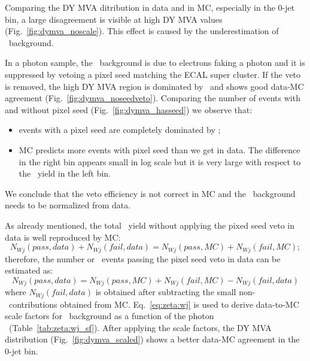 Comparing the DY MVA ditribution in data and in MC, especially in the 0-jet bin, a large disagreement is visible at high DY MVA values (Fig.~\ref{fig:dymva_noscale}).
This effect is caused by the underestimation of \Wjets\ background.

In a photon sample, the \Wjets\ background is due to electrons faking a photon and it is suppressed by vetoing a pixel seed matching the ECAL super cluster.
If the veto is removed, the high DY MVA region is dominated by \Wjets\ and shows good data-MC agreement (Fig.~\ref{fig:dymva_noseedveto}).
Comparing the number of events with and without pixel seed (Fig.~\ref{fig:dymva_hasseed}) we observe that: 
\begin{itemize}
\item events with a pixel seed are completely dominated by \Wjets;
\item MC predicts more events with pixel seed than we get in data. The difference in the right bin appears small in log scale but it is very large with respect to the \Wjets\ yield in the left bin.
\end{itemize}
We conclude that the veto efficiency is not correct in MC and the \Wjets\ background needs to be normalized from data.

As already mentioned, the total \Wjets\ yield without applying the pixed seed veto in data is well reproduced by MC: 
\begin{equation}
N_{Wj}(pass, data)+N_{Wj}(fail, data) = N_{Wj}(pass, MC)+N_{Wj}(fail, MC);
\end{equation}
therefore, the number or \Wjets\ events passing the pixel seed veto in data can be estimated as:
\begin{equation}
N_{Wj}(pass, data) = N_{Wj}(pass, MC)+N_{Wj}(fail, MC)-N_{Wj}(fail, data)
\label{eq:zeta:wj}
\end{equation}
where $N_{Wj}(fail, data)$ is obtained after subtracting the small non-\Wjets\ contributions obtained from MC.
Eq.~\ref{eq:zeta:wj} is used to derive data-to-MC scale factors for \Wjets\ background as a function of the photon \pt\ (Table~\ref{tab:zeta:wj_sf}).
After applying the scale factors, the DY MVA distribution (Fig.~\ref{fig:dymva_scaled}) shows a better data-MC agreement in the 0-jet bin.

